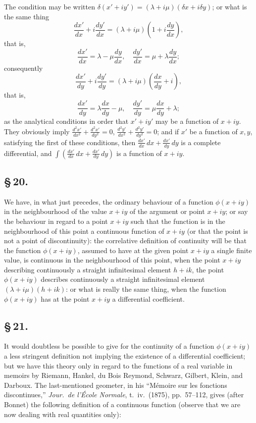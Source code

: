 \documentclass[11pt,a4paper]{article}
\begin{document}
The condition may be written $\delta(x' + iy') = (\lambda + i\mu)(\delta x + i\delta y)$; or what is the same thing
\[
\frac{dx'}{dx} + i\frac{dy'}{dx} = (\lambda + i\mu)\left(1 + i\frac{dy}{dx}\right),
\]
that is,
\[
\frac{dx'}{dx} = \lambda - \mu\frac{dy}{dx}, \quad \frac{dy'}{dx} = \mu + \lambda\frac{dy}{dx};
\]
consequently
\[
\frac{dx'}{dy} + i\frac{dy'}{dy} = (\lambda + i\mu)\left(\frac{dx}{dy} + i\right),
\]
that is,
\[
\frac{dx'}{dy} = \lambda\frac{dx}{dy} - \mu, \quad \frac{dy'}{dy} = \mu\frac{dx}{dy} + \lambda;
\]
as the analytical conditions in order that $x' + iy'$ may be a function of $x + iy$. They obviously imply $\frac{d^{2}x'}{dx^{2}} + \frac{d^{2}x'}{dy^{2}} = 0$, $\frac{d^{2}y'}{dx^{2}} + \frac{d^{2}y'}{dy^{2}} = 0$; and if $x'$ be a function of $x, y$, satisfying the first of these conditions, then $\frac{dx'}{dx}\,dx + \frac{dx'}{dy}\,dy$ is a complete differential, and $\int\left(\frac{dx'}{dx}\,dx + \frac{dx'}{dy}\,dy\right)$ is a function of $x + iy$.

\subsection*{\S\,20.}

We have, in what just precedes, the ordinary behaviour of a function $\phi(x + iy)$ in the neighbourhood of the value $x + iy$ of the argument or point $x + iy$; or say the behaviour in regard to a point $x + iy$ such that the function is in the neighbourhood of this point a continuous function of $x + iy$ (or that the point is not a point of discontinuity): the correlative definition of continuity will be that the function $\phi(x + iy)$, assumed to have at the given point $x + iy$ a single finite value, is continuous in the neighbourhood of this point, when the point $x + iy$ describing continuously a straight infinitesimal element $h + ik$, the point $\phi(x + iy)$ describes continuously a straight infinitesimal element $(\lambda + i\mu)(h + ik)$: or what is really the same thing, when the function $\phi(x + iy)$ has at the point $x + iy$ a differential coefficient.

\subsection*{\S\,21.}

It would doubtless be possible to give for the continuity of a function $\phi(x + iy)$ a less stringent definition not implying the existence of a differential coefficient; but we have this theory only in regard to the functions of a real variable in memoirs by Riemann, Hankel, du Bois Reymond, Schwarz, Gilbert, Klein, and Darboux. The last-mentioned geometer, in his ``M\'{e}moire sur les fonctions discontinues,'' \textit{Jour.\ de l'\'{E}cole Normale}, t.~iv.\ (1875), pp.~57--112, gives (after Bonnet) the following definition of a continuous function (observe that we are now dealing with real quantities only):
\end{document}
